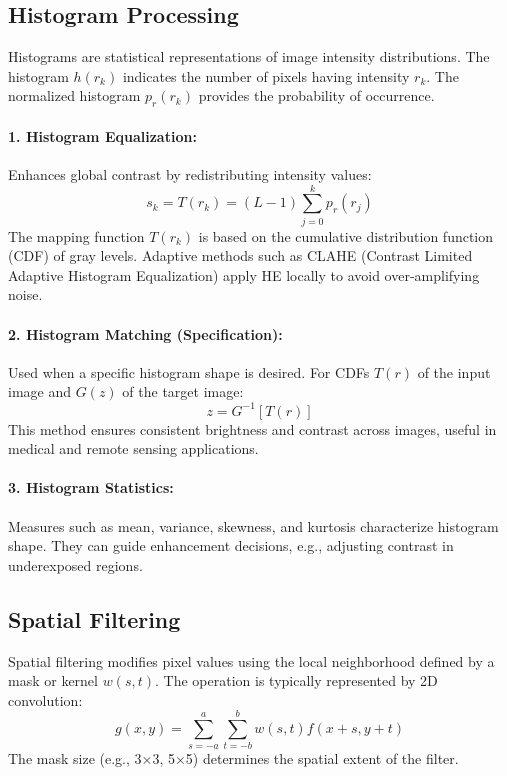 \documentclass[12pt,a4paper]{AnantDocumentation}
\begin{document}
\subsection{Histogram Processing}
Histograms are statistical representations of image intensity distributions. The histogram $h(r_k)$ indicates the number of pixels having intensity $r_k$. The normalized histogram $p_r(r_k)$ provides the probability of occurrence.

\paragraph{1. Histogram Equalization:} Enhances global contrast by redistributing intensity values:
\begin{equation}
s_k = T(r_k) = (L - 1) \sum_{j=0}^{k} p_r(r_j)
\end{equation}
The mapping function $T(r_k)$ is based on the cumulative distribution function (CDF) of gray levels. Adaptive methods such as CLAHE (Contrast Limited Adaptive Histogram Equalization) apply HE locally to avoid over-amplifying noise.

\paragraph{2. Histogram Matching (Specification):} Used when a specific histogram shape is desired. For CDFs $T(r)$ of the input image and $G(z)$ of the target image:
\begin{equation}
z = G^{-1}[T(r)]
\end{equation}
This method ensures consistent brightness and contrast across images, useful in medical and remote sensing applications.

\paragraph{3. Histogram Statistics:} Measures such as mean, variance, skewness, and kurtosis characterize histogram shape. They can guide enhancement decisions, e.g., adjusting contrast in underexposed regions.

\subsection{Spatial Filtering}
Spatial filtering modifies pixel values using the local neighborhood defined by a mask or kernel $w(s, t)$. The operation is typically represented by 2D convolution:
\begin{equation}
g(x, y) = \sum_{s=-a}^{a}\sum_{t=-b}^{b} w(s, t)f(x+s, y+t)
\end{equation}
The mask size (e.g., 3×3, 5×5) determines the spatial extent of the filter.
\end{document}
